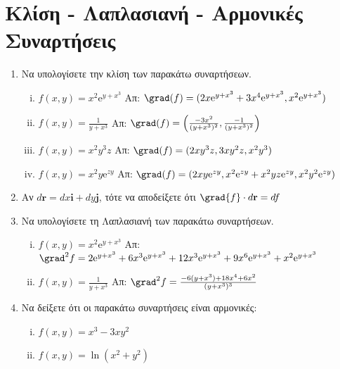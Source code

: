 



\pagestyle{askhseis}
\everymath{\displaystyle}




\begin{center}
  {\color{Col1}}
\end{center} 

\vspace{\baselineskip}

\section*{Κλίση - Λαπλασιανή - Αρμονικές Συναρτήσεις}

\begin{enumerate}
  \item Να υπολογίσετε την κλίση των παρακάτω συναρτήσεων.
    \begin{enumerate}[i)]
      \item $ f(x,y) = x^{2} \mathrm{e}^{y+x^{3}} $ 
        \hfill Απ: $ \grad(f) = (2x\mathrm{e}^{y+x^{3}}+3x^{4}\mathrm{e}^{y+x^{3}}, 
        x^{2} \mathrm{e}^{y+x^{3}}) $ 
      \item $ f(x,y) = \frac{1}{y+x^{3}} $ 
        \hfill Απ: $\grad(f) =\left(\frac{-3x^{2}}{(y+x^{3})^{2}},
        \frac{-1}{(y+x^{3})^{2}}\right)$ 
      \item $ f(x,y) = x^{2}y^{3}z $   
        \hfill Απ: $ \grad(f) = (2xy^{3}z,3xy^{2}z,x^{2}y^{3}) $ 
      \item $ f(x,y) = x^{2} y \mathrm{e}^{zy}  $ 
        \hfill Απ: $ \grad(f) = (2xy\mathrm{e}^{zy},
        x^{2}\mathrm{e}^{zy}+x^{2}yz\mathrm{e}^{zy},x^{2}y^{2} \mathrm{e}^{zy})$ 
    \end{enumerate}

  \item Αν $ d\mathbf{r} = dx \mathbf{i}+ dy \mathbf{j}$, τότε να αποδείξετε ότι 
    $ \grad{f} \cdot d \mathbf{r} = df $

  \item Να υπολογίσετε τη Λαπλασιανή των παρακάτω συναρτήσεων.
    \begin{enumerate}[i)]
      \item $ f(x,y) = x^{2} \mathrm{e}^{y+x^{3}} $ 
        \hfill Απ: $ \grad^{2} f = 2 \mathrm{e}^{y+x^{3}} + 6x^{3} \mathrm{e}^{y+x^{3}} 
        + 12x^{3} \mathrm{e}^{y+x^{3}} + 9x^{6} \mathrm{e}^{y+x^{3}} + x^{2}
        \mathrm{e}^{y+x^{3}} $ 
      \item $ f(x,y) = \frac{1}{y+x^{3}} $
        \hfill Απ: $ \grad^{2}f = \frac{-6(y+x^{3})+18x^{4}+6x^{2}}{(y+x^{3})^{3}} $ 
    \end{enumerate}

  \item Να δείξετε ότι οι παρακάτω συναρτήσεις είναι αρμονικές:
    \begin{enumerate}[(i)]
      \item $ f(x,y) = x^{3}-3xy^{2} $
      \item $ f(x,y) = \ln(x^{2} + y^{2}) $
    \end{enumerate}
\end{enumerate}


